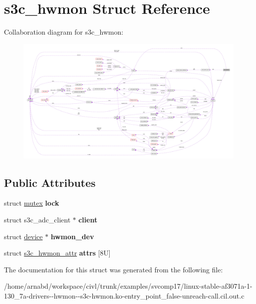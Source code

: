 \hypertarget{structs3c__hwmon}{}\section{s3c\+\_\+hwmon Struct Reference}
\label{structs3c__hwmon}


Collaboration diagram for s3c\+\_\+hwmon\+:
\nopagebreak
\begin{figure}[H]
\begin{center}
\leavevmode
\includegraphics[width=350pt]{structs3c__hwmon__coll__graph}
\end{center}
\end{figure}
\subsection*{Public Attributes}
\begin{DoxyCompactItemize}
\item 
\hypertarget{structs3c__hwmon_ac391ba200def2e945839a8876171d802}{}struct \hyperlink{structmutex}{mutex} {\bfseries lock}\label{structs3c__hwmon_ac391ba200def2e945839a8876171d802}

\item 
\hypertarget{structs3c__hwmon_acddb59d4e530555d00dff0d450f54b63}{}struct s3c\+\_\+adc\+\_\+client $\ast$ {\bfseries client}\label{structs3c__hwmon_acddb59d4e530555d00dff0d450f54b63}

\item 
\hypertarget{structs3c__hwmon_af0f9b3ea62593a94d1be939eebc0900f}{}struct \hyperlink{structdevice}{device} $\ast$ {\bfseries hwmon\+\_\+dev}\label{structs3c__hwmon_af0f9b3ea62593a94d1be939eebc0900f}

\item 
\hypertarget{structs3c__hwmon_ab7224c12c7544c6a87f4b1dec84b3b4c}{}struct \hyperlink{structs3c__hwmon__attr}{s3c\+\_\+hwmon\+\_\+attr} {\bfseries attrs} \mbox{[}8\+U\mbox{]}\label{structs3c__hwmon_ab7224c12c7544c6a87f4b1dec84b3b4c}

\end{DoxyCompactItemize}


The documentation for this struct was generated from the following file\+:\begin{DoxyCompactItemize}
\item 
/home/arnabd/workspace/civl/trunk/examples/svcomp17/linux-\/stable-\/af3071a-\/1-\/130\+\_\+7a-\/drivers-\/-\/hwmon-\/-\/s3c-\/hwmon.\+ko-\/entry\+\_\+point\+\_\+false-\/unreach-\/call.\+cil.\+out.\+c\end{DoxyCompactItemize}
